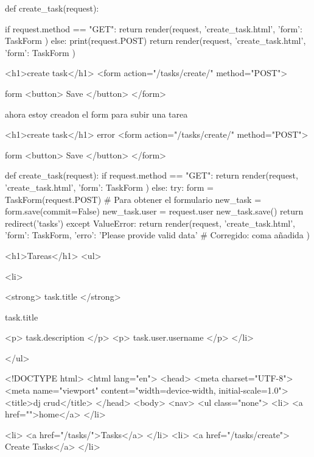 {{{{{{{{{{{{{{{ 
 def create_task(request):
    
    if request.method == "GET":
         return render(request, 'create_task.html', {
         'form': TaskForm
        }) 
    else:
        print(request.POST)
        return render(request, 'create_task.html', {
         'form': TaskForm
          }) 
 {%


{%
<h1>create task</h1>
<form action="/tasks/create/" method="POST">
    {%
    {{form}}
    <button>
        Save
    </button>
</form>
{%

ahora estoy creadon el form para subir una tarea

{%


{%
<h1>create task</h1>
    {{error}}
<form action="/tasks/create/" method="POST">
    {%
    {{form}}
    <button>
        Save
    </button>
</form>
{%


def create_task(request):
    if request.method == "GET":
        return render(request, 'create_task.html', {
            'form': TaskForm
        }) 
    else:
        try:
            form = TaskForm(request.POST)  # Para obtener el formulario
            new_task = form.save(commit=False)
            new_task.user = request.user
            new_task.save()
            return redirect('tasks')
        except ValueError:
            return render(request, 'create_task.html', {
                'form': TaskForm,
                'erro': 'Please provide valid data'  # Corregido: coma añadida
            })

       {%

{%
<h1>Tareas</h1>
<ul>
    {%
    <li>
        {%
        <strong>{{ task.title }}</strong>
        {%
        {{ task.title }}
        {%
        <p>{{ task.description }}</p>
        <p>{{ task.user.username }}</p>
    </li>
    {%
</ul>
{%

<!DOCTYPE html>
<html lang="en">
<head>
    <meta charset="UTF-8">
    <meta name="viewport" content="width=device-width, initial-scale=1.0">
    <title>dj crud</title>
</head>
<body>
<nav>
    <ul class="none">
        <li>
            <a href="">home</a>
        </li>
       
        {%
        <li>
            <a href="/tasks/">Tasks</a>
        </li>
        <li>
            <a href="/tasks/create"> Create Tasks</a>
        </li>
        {%
      
}}}}}}}}}}}}}}}}}}}}}}}}}}}}}}}}}
